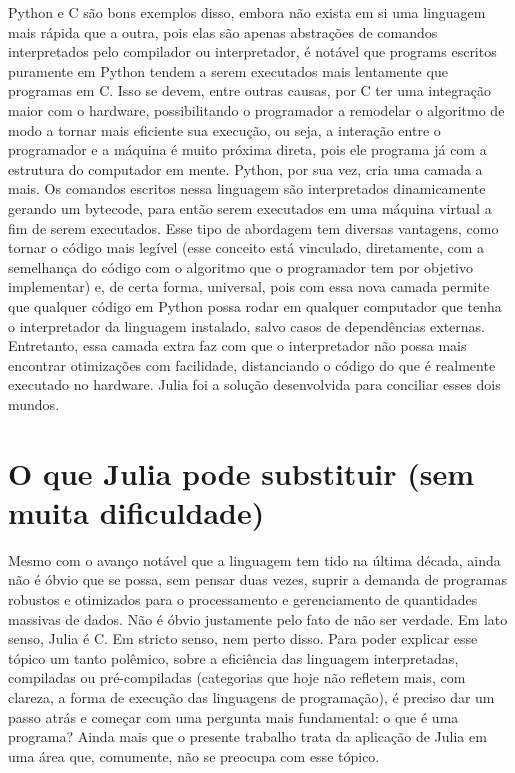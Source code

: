 Python e C são bons exemplos disso, embora não exista em si uma linguagem mais rápida que a outra, pois elas são apenas abstrações de comandos interpretados pelo compilador ou interpretador, é notável que programs escritos puramente em Python tendem a serem executados mais lentamente que programas em C. Isso se devem, entre outras causas, por C ter uma integração maior com o hardware, possibilitando o programador a remodelar o algoritmo de modo a tornar mais eficiente sua execução, ou seja, a interação entre o programador e a máquina é muito próxima direta, pois ele programa já com a estrutura do computador em mente. Python, por sua vez, cria uma camada a mais. Os comandos escritos nessa linguagem são interpretados dinamicamente gerando um bytecode, para então serem executados em uma máquina virtual a fim de serem executados. Esse tipo de abordagem tem diversas vantagens, como tornar o código mais legível (esse conceito está vinculado, diretamente, com a semelhança do código com o algoritmo que o programador tem por objetivo implementar) e, de certa forma, universal, pois com essa nova camada permite que qualquer código em Python possa rodar em qualquer computador que tenha o interpretador da linguagem instalado, salvo casos de dependências externas. Entretanto, essa camada extra faz com que o interpretador não possa mais encontrar otimizações com facilidade, distanciando o código do que é realmente executado no hardware. Julia foi a solução desenvolvida para conciliar esses dois mundos.

\section{O que Julia pode substituir (sem muita dificuldade)}

Mesmo com o avanço notável que a linguagem tem tido na última década, ainda não é óbvio que se possa, sem pensar duas vezes, suprir a demanda de programas robustos e otimizados para o processamento e gerenciamento de quantidades massivas de dados. Não é óbvio justamente pelo fato de não ser verdade. Em lato senso, Julia é C. Em stricto senso, nem perto disso. Para poder explicar esse tópico um tanto polêmico, sobre a eficiência das linguagem interpretadas, compiladas ou pré-compiladas (categorias que hoje não refletem mais, com clareza, a forma de execução das linguagens de programação), é preciso dar um passo atrás e começar com uma pergunta mais fundamental: o que é uma programa? Ainda mais que o presente trabalho trata da aplicação de Julia em uma área que, comumente, não se preocupa com esse tópico.

